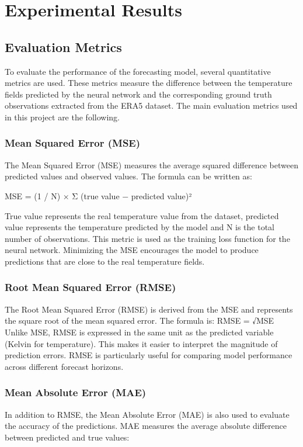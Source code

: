 \chapter{Experimental Results}
\label{chap:Experimental Results}

\section{Evaluation Metrics}
To evaluate the performance of the forecasting model, several quantitative metrics are used. These metrics measure the difference between the temperature fields predicted by the neural network and the corresponding ground truth observations extracted from the ERA5 dataset.
The main evaluation metrics used in this project are the following.
\subsection{Mean Squared Error (MSE)}
The Mean Squared Error (MSE) measures the average squared difference between predicted values and observed values.
The formula can be written as:

MSE = (1 / N) × Σ (true value − predicted value)²

True value represents the real temperature value from the dataset, predicted value represents the temperature predicted by the model and N is the total number of observations.
This metric is used as the training loss function for the neural network. Minimizing the MSE encourages the model to produce predictions that are close to the real temperature fields.

\subsection{Root Mean Squared Error (RMSE)}
The Root Mean Squared Error (RMSE) is derived from the MSE and represents the square root of the mean squared error.
The formula is:
RMSE = √MSE
Unlike MSE, RMSE is expressed in the same unit as the predicted variable (Kelvin for temperature). This makes it easier to interpret the magnitude of prediction errors.
RMSE is particularly useful for comparing model performance across different forecast horizons.

\subsection{Mean Absolute Error (MAE)}
In addition to RMSE, the Mean Absolute Error (MAE) is also used to evaluate the accuracy of the predictions.
MAE measures the average absolute difference between predicted and true values:

